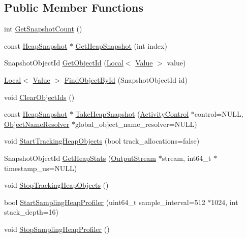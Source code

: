 \subsection*{Public Member Functions}
\begin{DoxyCompactItemize}
\item 
int \hyperlink{classv8_1_1HeapProfiler_a24830775a0ab938eb0a29ed8f3dfd265}{Get\+Snapshot\+Count} ()
\item 
const \hyperlink{classv8_1_1HeapSnapshot}{Heap\+Snapshot} $\ast$ \hyperlink{classv8_1_1HeapProfiler_af9093f6ca6e5558315f354c7ccb55484}{Get\+Heap\+Snapshot} (int index)
\item 
Snapshot\+Object\+Id \hyperlink{classv8_1_1HeapProfiler_ab926a1f1ed95b731d4ef3133e67eef19}{Get\+Object\+Id} (\hyperlink{classv8_1_1Local}{Local}$<$ \hyperlink{classv8_1_1Value}{Value} $>$ value)
\item 
\hyperlink{classv8_1_1Local}{Local}$<$ \hyperlink{classv8_1_1Value}{Value} $>$ \hyperlink{classv8_1_1HeapProfiler_ace729f9b7dbb2ca8b2fd67551bf5aae8}{Find\+Object\+By\+Id} (Snapshot\+Object\+Id id)
\item 
void \hyperlink{classv8_1_1HeapProfiler_a8a90c630543ed1875cbf9166239ff8d3}{Clear\+Object\+Ids} ()
\item 
const \hyperlink{classv8_1_1HeapSnapshot}{Heap\+Snapshot} $\ast$ \hyperlink{classv8_1_1HeapProfiler_a4af9159585ab024175d8eff551804ea8}{Take\+Heap\+Snapshot} (\hyperlink{classv8_1_1ActivityControl}{Activity\+Control} $\ast$control=N\+U\+LL, \hyperlink{classv8_1_1HeapProfiler_1_1ObjectNameResolver}{Object\+Name\+Resolver} $\ast$global\+\_\+object\+\_\+name\+\_\+resolver=N\+U\+LL)
\item 
void \hyperlink{classv8_1_1HeapProfiler_a02917db133b7efd468c9c73075a15171}{Start\+Tracking\+Heap\+Objects} (bool track\+\_\+allocations=false)
\item 
Snapshot\+Object\+Id \hyperlink{classv8_1_1HeapProfiler_a756d71126e0effc7543fb33e856dd738}{Get\+Heap\+Stats} (\hyperlink{classv8_1_1OutputStream}{Output\+Stream} $\ast$stream, int64\+\_\+t $\ast$timestamp\+\_\+us=N\+U\+LL)
\item 
void \hyperlink{classv8_1_1HeapProfiler_ae448d9474ae34781133d4a4547b08cb1}{Stop\+Tracking\+Heap\+Objects} ()
\item 
bool \hyperlink{classv8_1_1HeapProfiler_a006cb1071d1939cc250367ef9081d23f}{Start\+Sampling\+Heap\+Profiler} (uint64\+\_\+t sample\+\_\+interval=512 $\ast$1024, int stack\+\_\+depth=16)
\item 
void \hyperlink{classv8_1_1HeapProfiler_abc43e12e6febb087be251c0629ff17bf}{Stop\+Sampling\+Heap\+Profiler} ()

\end{DoxyCompactItemize}

